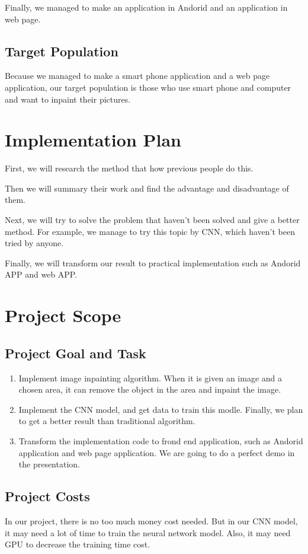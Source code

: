 \documentclass[12pt]{article}
\begin{document}
\qquad Finally, we managed to make an application in Andorid and an application in web page.
\subsection{Target Population}
\qquad Because we managed to make a smart phone application and a web page application, our target population is those who use smart phone and computer and want to inpaint their pictures.
\section{Implementation Plan}
\qquad First, we will research the method that how previous people do this. 

\qquad Then we will summary their work and find the advantage and disadvantage of them. 

\qquad Next, we will try to solve the problem that haven't been solved and give a better method. For example, we manage to try this topic by CNN, which haven't been tried by anyone. 

\qquad Finally, we will transform our result to practical implementation such as Andorid APP and web APP.
\section{Project Scope}
\subsection{Project Goal and Task}
\begin{enumerate}[1.]
	\item Implement image inpainting algorithm. When it is given an image and a chosen area, it can remove the object in the area and inpaint the image.
	\item Implement the CNN model, and get data to train this modle. Finally, we plan to get a better result than traditional algorithm.
	\item Transform the implementation code to frond end application, such as Andorid application and web page application. We are going to do a perfect demo in the presentation. 
\end{enumerate}
\subsection{Project Costs}
\qquad In our project, there is no too much money cost needed. But in our CNN model, it may need a lot of time to train the neural network model. Also, it may need GPU to decrease the training time cost.
\end{document}
